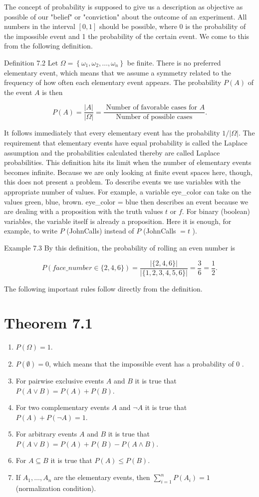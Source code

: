\documentclass[10pt]{article}
\begin{document}
The concept of probability is supposed to give us a description as objective as possible of our "belief" or "conviction" about the outcome of an experiment. All numbers in the interval $[0,1]$ should be possible, where 0 is the probability of the impossible event and 1 the probability of the certain event. We come to this from the following definition.

Definition 7.2 Let $\Omega=\left\{\omega_{1}, \omega_{2}, \ldots, \omega_{n}\right\}$ be finite. There is no preferred elementary event, which means that we assume a symmetry related to the frequency of how often each elementary event appears. The probability $P(A)$ of the event $A$ is then

$$
P(A)=\frac{|A|}{|\Omega|}=\frac{\text { Number of favorable cases for } A}{\text { Number of possible cases }} .
$$

It follows immediately that every elementary event has the probability $1 /|\Omega|$. The requirement that elementary events have equal probability is called the Laplace assumption and the probabilities calculated thereby are called Laplace probabilities. This definition hits its limit when the number of elementary events becomes infinite. Because we are only looking at finite event spaces here, though, this does not present a problem. To describe events we use variables with the appropriate number of values. For example, a variable eye\_color can take on the values green, blue, brown. eye\_color = blue then describes an event because we are dealing with a proposition with the truth values $t$ or $f$. For binary (boolean) variables, the variable itself is already a proposition. Here it is enough, for example, to write $P$ (JohnCalls) instead of $P$ (JohnCalls $=t$ ).

Example 7.3 By this definition, the probability of rolling an even number is

$$
P\left(f a c e \_n u m b e r \in\{2,4,6\}\right)=\frac{|\{2,4,6\}|}{|\{1,2,3,4,5,6\}|}=\frac{3}{6}=\frac{1}{2} .
$$

The following important rules follow directly from the definition.

\section*{Theorem 7.1}
\begin{enumerate}
  \item $P(\Omega)=1$.
  \item $P(\emptyset)=0$, which means that the impossible event has a probability of 0 .
  \item For pairwise exclusive events $A$ and $B$ it is true that $P(A \vee B)=P(A)+P(B)$.
  \item For two complementary events $A$ and $\neg A$ it is true that $P(A)+P(\neg A)=1$.
  \item For arbitrary events $A$ and $B$ it is true that $P(A \vee B)=P(A)+P(B)- P(A \wedge B)$.
  \item For $A \subseteq B$ it is true that $P(A) \leq P(B)$.
  \item If $A_{1}, \ldots, A_{n}$ are the elementary events, then $\sum_{i=1}^{n} P\left(A_{i}\right)=1$ (normalization condition).
\end{enumerate}
\end{document}
